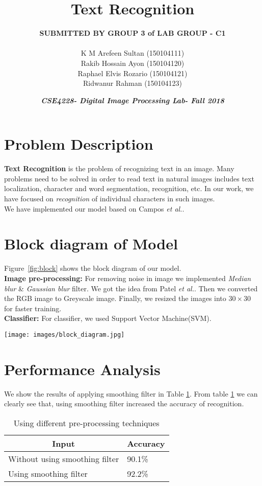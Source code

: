 \documentclass[10pt,a4paper]{article}
\date{\emph{\textbf{CSE4228- Digital Image Processing Lab- Fall 2018}}}
\title{\textbf{Text Recognition}}
\author{ \textbf{SUBMITTED BY GROUP 3 of LAB GROUP - C1}\\\ \\
        K M Arefeen Sultan (150104111)\\
		Rakib Hossain Ayon (150104120)\\
		Raphael Elvis Rozario (150104121)\\
		Ridwanur Rahman (150104123)\\
		}
\begin{document}
\maketitle
\thispagestyle{empty}
\newpage
\section{Problem Description}
\textbf{Text Recognition} is the problem of recognizing text in an image. Many problems need to be solved in order to read text in natural images includes text localization, character and word segmentation, recognition, etc. In our work, we have focused on \textit{recognition} of individual characters in such images. \\
We have implemented our model based on Campos \emph{et al.}\cite{de2009character}.

\section{Block diagram of Model} 
Figure~\ref{fig:block} shows the block diagram of our model. \\

\textbf{Image pre-processing:} For removing noise in image we implemented \textit{Median blur} \& \textit{Gaussian blur} filter. We got the idea from Patel \emph{et al.}\cite{patel2014survey}. Then we converted the RGB image to Greyscale image. Finally, we resized the images into $30\times30$ for faster training. 
\\

\textbf{Classifier:} For classifier, we used Support Vector Machine(SVM).

\begin{figure*}[!htb]
\centering
\texttt{[image: images/block\_diagram.jpg]}
\caption{Block diagram of our model}
\label{fig:block}
\end{figure*}

\section{Performance Analysis}
We show the results of applying smoothing filter in Table \ref{my-table}. From table \ref{my-table} we can clearly see that, using smoothing filter increased the accuracy of recognition.

\begin{table}[!htb]
\centering
\begin{tabular}{|l|l|}
\hline
\multicolumn{1}{|c|}{\textbf{Input}} & \multicolumn{1}{c|}{\textbf{Accuracy}} \\ \hline
Without using smoothing filter       & 90.1\%                                 \\ \hline
Using smoothing filter               & 92.2\%                                 \\ \hline
\end{tabular}
\caption{Using different pre-processing techniques}
\label{my-table}
\end{table}



\end{document}
